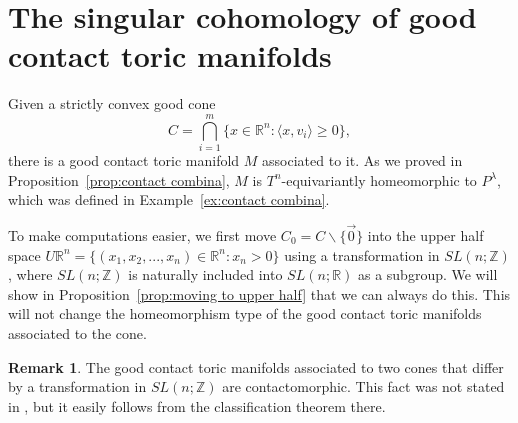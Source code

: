 \documentclass[12pt]{amsart}
\def\Z {{\mathbb{Z}}}
\def\R {{\mathbb{R}}}
\theoremstyle{definition}
\newtheorem{remark}[theorem]{Remark}
\numberwithin{equation}{section}
\begin{document}
\section{\bf The singular cohomology of good contact toric manifolds}\label{sec:cohomology contact}
Given a strictly convex good cone
\begin{equation}
 C= \bigcap_{i=1}^{m}\{x\in \R^n: \langle x, v_{i}\rangle \geq 0\},
\end{equation}
there is a good contact toric manifold $M$ associated to it. As we
proved in Proposition~\ref{prop:contact combina}, $M$ is
$T^n$-equivariantly homeomorphic to $P^{\lambda}$, which was defined
in Example~\ref{ex:contact combina}.

To make computations easier, we first move
$C_{0}=C\backslash\{\vec{0}\}$ into the upper half space $U\R^n=
\{(x_{1},x_{2},...,x_{n})\in \R^n:x_{n}>0\}$ using a transformation
in $SL(n;\Z)$, where $SL(n;\Z)$ is naturally included into
$SL(n;\R)$ as a subgroup. We will show in
Proposition~\ref{prop:moving to upper half} that we can always do
this. This will not change the homeomorphism type of the good
contact toric manifolds associated to the cone.

\begin{remark}
The good contact toric manifolds associated to two cones that differ
by a transformation in $SL(n;\Z)$ are contactomorphic. This fact was
not stated in \cite{L:contact toric}, but it easily follows from the
classification theorem there.
\end{remark}
\end{document}
